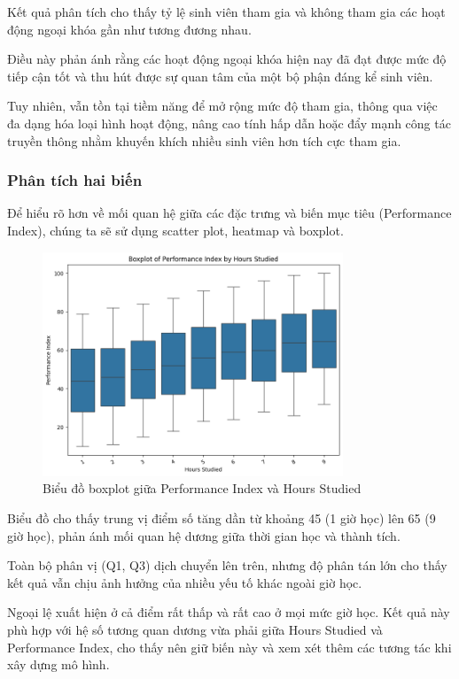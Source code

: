Kết quả phân tích cho thấy tỷ lệ sinh viên tham gia và không tham gia các hoạt động ngoại khóa gần như tương đương nhau.

Điều này phản ánh rằng các hoạt động ngoại khóa hiện nay đã đạt được mức độ tiếp cận tốt và thu hút được sự quan tâm của một bộ phận đáng kể sinh viên.

Tuy nhiên, vẫn tồn tại tiềm năng để mở rộng mức độ tham gia, thông qua việc đa dạng hóa loại hình hoạt động, nâng cao tính hấp dẫn hoặc đẩy mạnh công tác truyền thông nhằm khuyến khích nhiều sinh viên hơn tích cực tham gia.

\subsubsection{Phân tích hai biến}
Để hiểu rõ hơn về mối quan hệ giữa các đặc trưng và biến mục tiêu (Performance Index), chúng ta sẽ sử dụng scatter plot, heatmap và boxplot.

\begin{figure}[H]
	\centering
	\includegraphics[width=0.8\textwidth]{images/eda/3.png}
	\caption{Biểu đồ boxplot giữa Performance Index và Hours Studied}
\end{figure}

Biểu đồ cho thấy trung vị điểm số tăng dần từ khoảng 45 (1 giờ học) lên 65 (9 giờ học), phản ánh mối quan hệ dương giữa thời gian học và thành tích.

Toàn bộ phân vị (Q1, Q3) dịch chuyển lên trên, nhưng độ phân tán lớn cho thấy kết quả vẫn chịu ảnh hưởng của nhiều yếu tố khác ngoài giờ học.

Ngoại lệ xuất hiện ở cả điểm rất thấp và rất cao ở mọi mức giờ học. Kết quả này phù hợp với hệ số tương quan dương vừa phải giữa Hours Studied và Performance Index, cho thấy nên giữ biến này và xem xét thêm các tương tác khi xây dựng mô hình.

